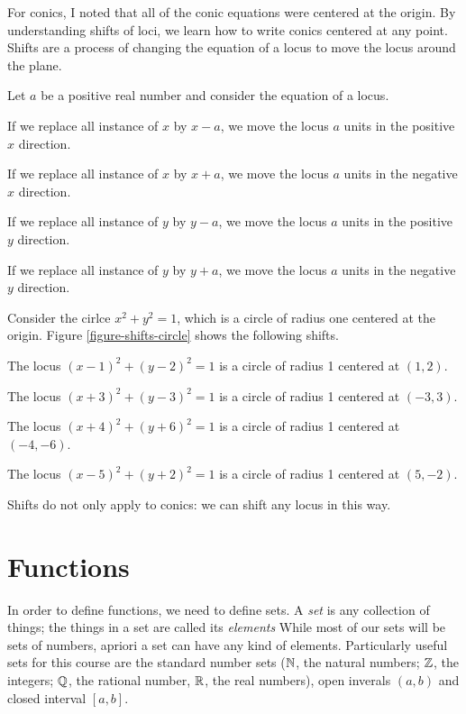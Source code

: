 \documentclass[fleqn]{report}
\begin{document}
For conics, I noted that all of the conic equations were
centered at the origin. By understanding shifts of loci, we
learn how to write conics centered at any point. Shifts are a
process of changing the equation of a locus to move the locus
around the plane. 

Let $a$ be a positive real number and consider the equation of
a locus.
\begin{smallitemize}
\item If we replace all instance of $x$ by $x-a$, we move the
locus $a$ units in the positive $x$ direction.
\item If we replace all instance of $x$ by $x+a$, we move the
locus $a$ units in the negative $x$ direction.
\item If we replace all instance of $y$ by $y-a$, we move the
locus $a$ units in the positive $y$ direction.
\item If we replace all instance of $y$ by $y+a$, we move the
locus $a$ units in the negative $y$ direction.
\end{smallitemize}
Consider the cirlce $x^2 + y^2 = 1$, which is a circle of
radius one centered at the origin. Figure \ref{figure-shifts-circle}
shows the following shifts.
\begin{smallitemize}
\item The locus $(x-1)^2 + (y-2)^2 = 1$ is a circle of radius
1 centered at $(1,2)$.
\item The locus $(x+3)^2 + (y-3)^2 = 1$ is a circle of radius
1 centered at $(-3,3)$.
\item The locus $(x+4)^2 + (y+6)^2 = 1$ is a circle of radius
1 centered at $(-4,-6)$.
\item The locus $(x-5)^2 + (y+2)^2 = 1$ is a circle of radius
1 centered at $(5,-2)$.
\end{smallitemize}
Shifts do not only apply to conics: we can shift any locus in
this way.

\section{Functions}
\label{functions}

In order to define functions, we need to define sets. A
\emph{set} is any collection of things; the things in a set
are called its \emph{elements} While most of our sets will be
sets of numbers, apriori a set can have any kind of elements. 
Particularly useful sets for this course are the standard
number sets ($\mathbb{N}$, the natural numbers; $\mathbb{Z}$, the integers;
$\mathbb{Q}$, the rational number, $\mathbb{R}$, the real numbers), open
inverals $(a,b)$ and closed interval $[a,b]$.
\end{document}
